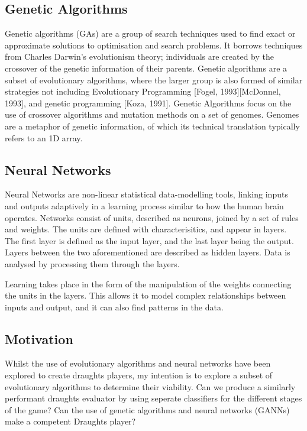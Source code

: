 \documentclass[12pt,a4paper]{article}
\begin{document}
\subsection*{Genetic Algorithms}

Genetic algorithms (GAs) are a group of search techniques used to find exact or approximate solutions to optimisation and search problems. It borrows techniques from Charles Darwin's evolutionism theory; individuals are created by the crossover of the genetic information of their parents. 
Genetic algorithms are a subset of evolutionary algorithms, where the larger group is also formed of similar strategies not including Evolutionary Programming [Fogel, 1993][McDonnel, 1993], and genetic programming [Koza, 1991]. Genetic Algorithms focus on the use of crossover algorithms and mutation methods on a set of genomes. Genomes are a metaphor of genetic information, of which its technical translation typically refers to an 1D array.

\subsection*{Neural Networks}

Neural Networks are non-linear statistical data-modelling tools, linking inputs and outputs adaptively in a learning process similar to how the human brain operates. Networks consist of units, described as neurons, joined by a set of rules and weights. The units are defined with characterisitics, and appear in layers. The first layer is defined as the input layer, and the last layer being the output. Layers between the two aforementioned are described as hidden layers. Data is analysed by processing them through the layers.

Learning takes place in the form of the manipulation of the weights connecting the units in the layers. This allows it to model complex relationships between inputs and output, and it can also find patterns in the data. 

\subsection*{Motivation}
Whilst the use of evolutionary algorithms and neural networks have been explored to create draughts players, my intention is to explore a subset of evolutionary algorithms to determine their viability. Can we produce a similarly performant draughts evaluator by using seperate classifiers for the different stages of the game? Can the use of genetic algorithms and neural networks (GANNs) make a competent Draughts player?
\end{document}
